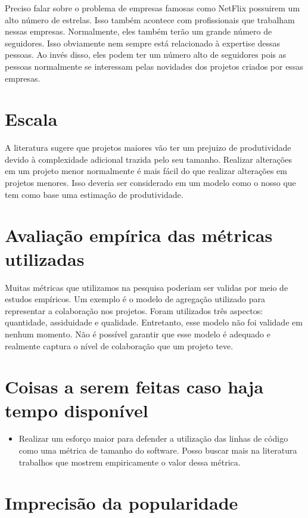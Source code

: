  
 Preciso falar sobre o problema de empresas famosas como NetFlix possuirem um alto número de estrelas. Isso também acontece com profissionais que trabalham nessas empresas. Normalmente, eles também terão um grande número de seguidores. Isso obviamente nem sempre está relacionado à expertise dessas pessoas. Ao invés disso, eles podem ter um número alto de seguidores pois as pessoas normalmente se interessam pelas novidades dos projetos criados por essas empresas. 
 
 \section{Escala}

A literatura sugere que projetos maiores vão ter um prejuizo de produtividade devido à complexidade adicional trazida pelo seu tamanho. Realizar alterações em um projeto menor normalmente é mais fácil do que realizar alterações em projetos menores. Isso deveria ser considerado em um modelo como o nosso que tem como base uma estimação de produtividade.

\section{Avaliação empírica das métricas utilizadas}

Muitas métricas que utilizamos na pesquisa poderiam ser validas por meio de estudos empíricos. Um exemplo é o modelo de agregação utilizado para representar a colaboração nos projetos. Foram utilizados três aspectos: quantidade, assiduidade e qualidade. Entretanto, esse modelo não foi validade em nenhum momento. Não é possível garantir que esse modelo é adequado e realmente captura o nível de colaboração que um projeto teve.


\section{Coisas a serem feitas caso haja tempo disponível}

\begin{itemize}
\item Realizar um esforço maior para defender a utilização das linhas de código como uma métrica de tamanho do software. Posso buscar mais na literatura trabalhos que mostrem empiricamente o valor dessa métrica.
\end{itemize}

\section{Imprecisão da popularidade}

